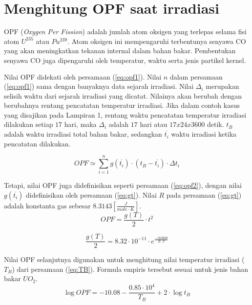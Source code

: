 \documentclass[a4paper,11pt]{report}
\begin{document}
\section{Menghitung OPF saat irradiasi}
\label{sec:OPF}
OPF (\textit{Oxygen Per Fission}) adalah jumlah atom oksigen yang terlepas selama fisi atom $U^{235}$ atau $Pu^{239}$. Atom oksigen ini mempengaruhi terbentunya senyawa CO yang akan meningkatkan tekanan internal dalam bahan bakar. Pembentukan senyawa CO juga dipengaruhi oleh temperatur, waktu serta jenis partikel kernel. 

Nilai OPF didekati oleh persamaan (\ref{eq:opf1}). Nilai $n$ dalam persamaan (\ref{eq:opf1}) sama dengan banyaknya data sejarah irradiasi. Nilai $\Delta_{i}$ merupakan selisih waktu dari sejarah irradiasi yang dicatat. Nilainya akan berubah dengan berubahnya rentang pencatatan temperatur irradiasi. Jika dalam contoh kasus yang disajikan pada Lampiran 1, rentang waktu pencatatan temperatur irradiasi dilakukan setiap $17$ hari, maka $\Delta_{i}$ adalah $17$ hari atau $17 x 24 x 3600$ detik. $t_B$ adalah waktu irradiasi total bahan bakar, sedangkan $\overline{t_i}$ waktu irradiasi ketika pencatatan dilakukan.

\begin{equation}
  OPF \simeq \sum_{i=1}^{n} g(\overline{t_{i}}) \cdot (t_{B}-\overline{t_{i}}) \cdot \Delta t_{i}
  \label{eq:opf1}
\end{equation}
 
Tetapi, nilai OPF juga didefinisikan seperti persamaan (\ref{eq:opf2}), dengan nilai $g(\overline{t_{i}})$ didefinisikan oleh persamaan (\ref{eq:gt}). Nilai $R$ pada persamaan (\ref{eq:gt}) adalah konstanta gas sebesar $8.3143 [\frac{J}{mole \cdot K}]$.
\begin{equation}
  OPF = \frac{g(T)}{2} \cdot t^2
  \label{eq:opf2}
\end{equation} 
 
\begin{equation}
  \frac{g(T)}{2}=8.32 \cdot 10^{-11} \cdot e^{\frac{-163000}{R \cdot T}}
  \label{eq:gt}
\end{equation} 
 
Nilai OPF selanjutnya digunakan untuk menghitung nilai temperatur irradiasi ($T_B$) dari persamaan (\ref{eq:TB}). Formula empiris tersebut sesuai untuk jenis bahan bakar $UO_2$.
\begin{equation}
  \log OPF=-10.08-\frac{0.85 \cdot 10^4}{T_B} + 2 \cdot \log t_B
  \label{eq:TB}
\end{equation} 
\end{document}
